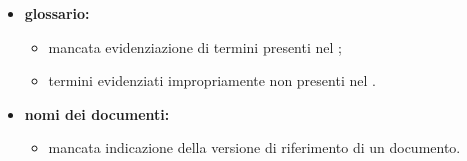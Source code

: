 \begin{itemize}
		\item \textbf{glossario:}
		\begin{itemize}
			\item mancata evidenziazione di termini presenti nel \gl;
			\item termini evidenziati impropriamente non presenti nel \gl.
		\end{itemize}
        \item \textbf{nomi dei documenti:}
        \begin{itemize}
            \item mancata indicazione della versione di riferimento di un documento.
        \end{itemize}
	\end{itemize}

